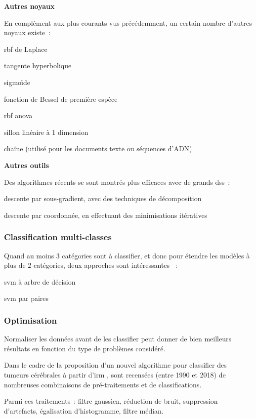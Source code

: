\pagebreak

\textbf{Autres noyaux}

En complément aux plus courants vus précédemment, un certain nombre
d’autres noyaux existe :

\begin{itmz}
\item{\gls{rbf} de Laplace}
\item{tangente hyperbolique}
\item{sigmoïde}
\item{fonction de Bessel de première espèce}
\item{\gls{rbf} \gls{anova}}
\item{sillon linéaire à 1 dimension}
\item{chaîne (utilisé pour les documents texte ou séquences d’ADN)}
\end{itmz}

\textbf{Autres outils}

Des algorithmes récents se sont montrés plus efficaces avec de grands \glspl{ds} :

\begin{itmz}
\item{descente par sous-gradient, avec des techniques de décomposition}
\item{descente par coordonnée, en effectuant des minimisations itératives}
\end{itmz}

\subsubsection{Classification multi-classes}

Quand au moins 3 catégories sont à classifier,
et donc pour étendre les modèles à plus de 2 catégories,
deux approches sont intéressantes \cite{multi-class} :

\begin{itmz}
\item{\gls{svm} à arbre de décision}
\item{\gls{svm} par paires}
\end{itmz}

\subsubsection{Optimisation}

Normaliser les données avant de les classifier peut donner de bien meilleurs
résultats en fonction du type de problèmes considéré.

Dans le cadre de la proposition d’un nouvel algorithme pour classifier des
tumeurs cérébrales à partir d’\gls{irm} \cite{mri}, sont recensées
(entre 1990 et 2018) de nombreuses combinaisons de pré-traitements
et de classifications. \cite{optimization}

Parmi ces traitements : filtre gaussien, réduction de bruit,
suppression d’artefacts, égalisation d’histogramme, filtre médian.

\pagebreak
